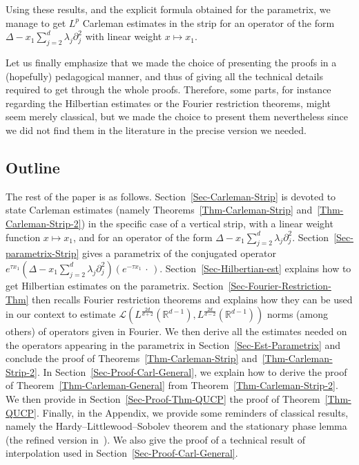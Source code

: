 \documentclass[10pt]{amsart}
\theoremstyle{definition}\newtheorem{defi}[theo]{Definition}\newtheorem{rema}[theo]{Remark}\newtheorem{exam}[theo]{Example}\newtheorem{exem}[theo]{Example}\newtheorem{nota}[theo]{Notation}
\newcommand{\scL}{\mathscr{L}}
\newcommand*\R{\mathbb{R}}
\begin{document}
Using these results, and the explicit formula obtained for the parametrix, we manage to get $L^p$ Carleman estimates in the strip for an operator of the form $\Delta - x_1 \sum_{j = 2}^d \lambda_j \partial_{j}^2$ with linear weight $x \mapsto x_1$.

Let us finally emphasize that we made the choice of presenting the proofs in a (hopefully) pedagogical manner, and thus of giving all the technical details required to get through the whole proofs. Therefore, some parts, for instance regarding the Hilbertian estimates or the Fourier restriction theorems, might seem merely classical, but we made the choice to present them nevertheless since we did not find them in the literature in the precise version we needed.

\subsection*{Outline} 

The rest of the paper is as follows. Section~\ref{Sec-Carleman-Strip} is devoted to state Carleman estimates (namely Theorems~\ref{Thm-Carleman-Strip} and~\ref{Thm-Carleman-Strip-2}) in the specific case of a vertical strip, with a linear weight function $x \mapsto x_1$, and for an operator of the form $\Delta - x_1 \sum_{j = 2}^d \lambda_j \partial_{j}^2$. Section~\ref{Sec-parametrix-Strip} gives a parametrix of the conjugated operator $e^{\tau x_1}(\Delta - x_1 \sum_{j = 2}^d \lambda_j \partial_{j}^2)(e^{-\tau x_1}\, \cdot \,)$. Section~\ref{Sec-Hilbertian-est} explains how to get Hilbertian estimates on the parametrix. Section~\ref{Sec-Fourier-Restriction-Thm} then recalls Fourier restriction theorems and explains how they can be used in our context to estimate $\scL(L^{\frac{2d}{d+2}}(\R^{d-1}),L^{\frac{2d}{d-2}}(\R^{d-1})) $ norms (among others) of operators given in Fourier. We then derive all the estimates needed on the operators appearing in the parametrix in Section~\ref{Sec-Est-Parametrix} and conclude the proof of Theorems~\ref{Thm-Carleman-Strip} and~\ref{Thm-Carleman-Strip-2}. In Section~\ref{Sec-Proof-Carl-General}, we explain how to derive the proof of Theorem~\ref{Thm-Carleman-General} from Theorem~\ref{Thm-Carleman-Strip-2}. We then provide in Section~\ref{Sec-Proof-Thm-QUCP} the proof of Theorem~\ref{Thm-QUCP}. Finally, in the Appendix, we provide some reminders of classical results, namely the Hardy--Littlewood--Sobolev theorem and the stationary phase lemma (the refined version in~\cite{alazard2017stationary}). We also give the proof of a technical result of interpolation used in Section~\ref{Sec-Proof-Carl-General}.
\end{document}
